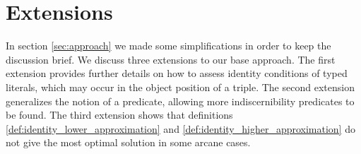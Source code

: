 \section{Extensions}
\label{sec:extensions}

In section \ref{sec:approach} 
  we made some simplifications in order to keep the discussion brief.
We discuss three extensions to our base approach.
The first extension provides further details on how to assess
  identity conditions of typed literals, which may occur in the object
  position of a triple.
The second extension generalizes the notion of a
  predicate, allowing more indiscernibility predicates to be found.
The third extension shows that definitions
  \ref{def:identity_lower_approximation} and
  \ref{def:identity_higher_approximation}
  do not give the most optimal solution in some arcane cases.






